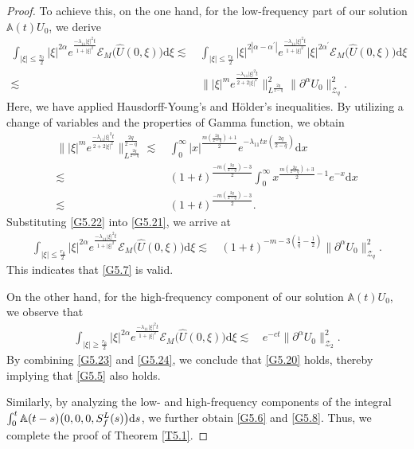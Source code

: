 \documentclass[reqno,11pt]{amsart}
\theoremstyle{plain}
\numberwithin{equation}{section}
\begin{document}
\begin{proof}
To achieve  this,  on the one hand, for the low-frequency part of our solution $\mathbb{A}(t)U_0$, we derive  
\begin{align}  \label{G5.21}
\int_{|\xi|\leq \frac{r_0}{2}} |\xi|^{2\alpha}e^{\frac{-\lambda_{11}|\xi|^{2}t}{1+|\xi|^{2}}}\mathcal{E}_{M}\big(\hat{U}(0,\xi)\big)\mathrm{d}\xi \lesssim&\, \int_{|\xi|\leq \frac{r_0}{2}} |\xi|^{2|\alpha-\alpha^{\prime}|}e^{\frac{-\lambda_{11}|\xi|^{2}t}{1+|\xi|^{2}}}|\xi|^{2\alpha^{\prime}}\mathcal{E}_{M}\big(\hat{U}(0,\xi)\big)\mathrm{d}\xi \nonumber \\  
\lesssim&\, \Big\||\xi|^{m} e^{\frac{-\lambda_{11}|\xi|^{2}t}{2+2|\xi|^{2}}}\Big\|_{L^{\frac{2q}{2-q}}}^2 \|\partial^{\alpha}U_{0}\|_{\mathcal{Z}_{q}}^2.  
\end{align}  
Here, we have applied   Hausdorff-Young's and Hölder's inequalities. By utilizing  a change of variables and the properties of   Gamma function, we obtain  
\begin{align}  \label{G5.22}
\Big\||\xi|^{m} e^{\frac{-\lambda_{11}|\xi|^{2}t}{2+2|\xi|^{2}}}\Big\|_{L^{\frac{2q}{2-q}}}^{\frac{2q}{2-q}} \lesssim&\, \int_{0}^{\infty} |x|^{\frac{m (\frac{2q}{2-q} )+1}{2}}e^{-\lambda_{11}tx (\frac{2q}{2-q} )}\mathrm{d}x \nonumber \\  
\lesssim&\, (1+t)^{\frac{-m (\frac{2q}{2-q} )-3}{2}} \int_{0}^{\infty} x^{\frac{m (\frac{2q}{2-q} )+3}{2}-1}e^{-x}\mathrm{d}x \nonumber \\  
\lesssim&\, (1+t)^{\frac{-m (\frac{2q}{2-q} )-3}{2}}.  
\end{align}  
Substituting \eqref{G5.22} into \eqref{G5.21}, we arrive at  
\begin{align}  \label{G5.23}
\int_{|\xi|\leq \frac{r_0}{2}} |\xi|^{2\alpha}e^{\frac{-\lambda_{11}|\xi|^{2}t}{1+|\xi|^{2}}}\mathcal{E}_{M}\big(\hat{U}(0,\xi)\big)\mathrm{d}\xi \lesssim&\,  (1+t )^{-m-3 (\frac{1}{q}-\frac{1}{2} )} \|\partial^{\alpha}U_{0}\|_{\mathcal{Z}_{q}}^2.  
\end{align}  
This indicates that  \eqref{G5.7} is valid.

On the other hand, for the high-frequency component of our solution $\mathbb{A}(t)U_0$, we observe that  
\begin{align}\label{G5.24}
\int_{|\xi|\geq \frac{r_0}{2}} |\xi|^{2\alpha}e^{\frac{-\lambda_{11}|\xi|^{2}t}{1+|\xi|^{2}}}\mathcal{E}_{M}\big(\hat{U}(0,\xi)\big)\mathrm{d}\xi \lesssim&\,   e^{-ct}\|\partial^{\alpha}U_{0}\|_{\mathcal{Z}_{2}}^2.  
\end{align}
By combining \eqref{G5.23} and \eqref{G5.24}, we conclude  that \eqref{G5.20} holds, thereby implying that \eqref{G5.5} also holds. 

Similarly, by analyzing the low- and high-frequency components of the integral $ \int_{0}^{t}\mathbb{A}(t-s)\big(0,0,0,\linebreak {S}_f^L(s)\big){\rm d}s$, we   further obtain \eqref{G5.6} and \eqref{G5.8}. Thus, we complete the proof of Theorem \ref{T5.1}.
\end{proof}
\end{document}
